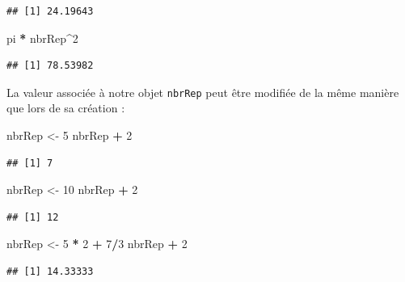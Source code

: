 \documentclass[]{book}
\newenvironment{Shaded}{\begin{snugshade}}{\end{snugshade}}
\newcommand{\DecValTok}[1]{\textcolor[rgb]{0.00,0.00,0.81}{#1}}
\newcommand{\StringTok}[1]{\textcolor[rgb]{0.31,0.60,0.02}{#1}}
\newcommand{\OperatorTok}[1]{\textcolor[rgb]{0.81,0.36,0.00}{\textbf{#1}}}
\newcommand{\NormalTok}[1]{#1}
\begin{document}
\begin{verbatim}
## [1] 24.19643
\end{verbatim}

\begin{Shaded}
\begin{Highlighting}[]
\NormalTok{pi }\OperatorTok{*}\StringTok{ }\NormalTok{nbrRep}\OperatorTok{^}\DecValTok{2}
\end{Highlighting}
\end{Shaded}

\begin{verbatim}
## [1] 78.53982
\end{verbatim}

La valeur associée à notre objet \texttt{nbrRep} peut être modifiée de
la même manière que lors de sa création :

\begin{Shaded}
\begin{Highlighting}[]
\NormalTok{nbrRep <-}\StringTok{ }\DecValTok{5}
\NormalTok{nbrRep }\OperatorTok{+}\StringTok{ }\DecValTok{2}
\end{Highlighting}
\end{Shaded}

\begin{verbatim}
## [1] 7
\end{verbatim}

\begin{Shaded}
\begin{Highlighting}[]
\NormalTok{nbrRep <-}\StringTok{ }\DecValTok{10}
\NormalTok{nbrRep }\OperatorTok{+}\StringTok{ }\DecValTok{2}
\end{Highlighting}
\end{Shaded}

\begin{verbatim}
## [1] 12
\end{verbatim}

\begin{Shaded}
\begin{Highlighting}[]
\NormalTok{nbrRep <-}\StringTok{ }\DecValTok{5} \OperatorTok{*}\StringTok{ }\DecValTok{2} \OperatorTok{+}\StringTok{ }\DecValTok{7}\OperatorTok{/}\DecValTok{3}
\NormalTok{nbrRep }\OperatorTok{+}\StringTok{ }\DecValTok{2}
\end{Highlighting}
\end{Shaded}

\begin{verbatim}
## [1] 14.33333
\end{verbatim}
\end{document}
